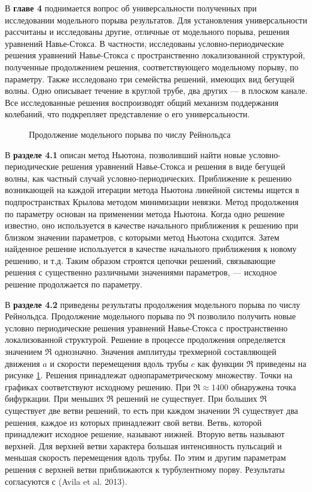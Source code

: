 В \textbf{главе 4} поднимается вопрос об универсальности полученных при исследовании модельного порыва результатов. Для установления универсальности рассчитаны и исследованы другие, отличные от модельного порыва, решения уравнений Навье-Стокса. В частности, исследованы условно-периодические решения уравнений Навье-Стокса с пространственно локализованной структурой, полученные продолжением решения, соответствующего модельному порыву, по параметру. Также исследовано три семейства решений, имеющих вид бегущей волны. Одно описывает течение в круглой трубе, два других --- в плоском канале. Все исследованные решения воспроизводят общий механизм поддержания колебаний, что подкрепляет представление о его универсальности.

\begin{figure}
\caption{Продолжение модельного порыва по числу Рейнольдса}
\label{contin_pic}
\end{figure} 

В \textbf{разделе 4.1} описан метод Ньютона, позволивший найти новые условно-периодические решения уравнений Навье-Стокса и решения в виде бегущей волны, как частный случай условно-периодических. Приближение к решению возникающей на каждой итерации метода Ньютона линейной системы ищется в подпространствах Крылова методом минимизации невязки. %
Метод продолжения по параметру основан на применении метода Ньютона. Когда одно решение известно, оно используется в качестве начального приближения к решению при близком значении параметров, с которыми метод Ньютона сходится. Затем найденное решение используется в качестве начального приближения к новому решению, и т.д. Таким образом строятся цепочки решений, связывающие решения с существенно различными значениями параметров, --- исходное решение продолжается по параметру.


В \textbf{разделе 4.2} приведены результаты продолжения модельного порыва по числу Рейнольдса. Продолжение модельного порыва по $\Re$ позволило получить новые условно периодические решения уравнений Навье-Стокса с пространственно локализованной структурой. Решение в процессе продолжения определяется значением $\Re$ однозначно. Значения амплитуды трехмерной составляющей движения $a$ и скорости перемещения вдоль трубы $c$ как функции $\Re$ приведены на рисунке \ref{contin_pic}. Решения принадлежат однопараметрическому множеству. Точки на графиках соответствуют исходному решению. При $\Re \approx 1400$ обнаружена точка бифуркации. При меньших $\Re$ решений не существует. При больших $\Re$ существует две ветви решений, то есть при каждом значении $\Re$ существует два решения, каждое из которых принадлежит свой ветви. Ветвь, которой принадлежит исходное решение, называют нижней. Вторую ветвь называют верхней. Для верхней ветви характера большая интенсивность пульсаций и меньшая скорость перемещения вдоль трубы. По этим и другим параметрам решения с верхней ветви приближаются к турбулентному порву. Результаты согласуются с (Avila et al. 2013). 

